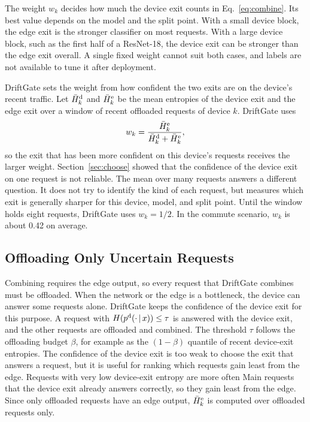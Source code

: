 The weight $w_k$ decides how much the device exit counts in Eq.~\eqref{eq:combine}. Its best value depends on the model and the split point. With a small device block, the edge exit is the stronger classifier on most requests. With a large device block, such as the first half of a ResNet-18, the device exit can be stronger than the edge exit overall. A single fixed weight cannot suit both cases, and labels are not available to tune it after deployment.

DriftGate sets the weight from how confident the two exits are on the device's recent traffic. Let $\bar H^{\mathrm{d}}_k$ and $\bar H^{\mathrm{e}}_k$ be the mean entropies of the device exit and the edge exit over a window of recent offloaded requests of device $k$. DriftGate uses
\begin{equation}
w_k=\frac{\bar H^{\mathrm{e}}_k}{\bar H^{\mathrm{d}}_k+\bar H^{\mathrm{e}}_k},
\label{eq:weight}
\end{equation}
so the exit that has been more confident on this device's requests receives the larger weight. Section~\ref{sec:choose} showed that the confidence of the device exit on one request is not reliable. The mean over many requests answers a different question. It does not try to identify the kind of each request, but measures which exit is generally sharper for this device, model, and split point. Until the window holds eight requests, DriftGate uses $w_k=1/2$. In the commute scenario, $w_k$ is about 0.42 on average.

\subsection{Offloading Only Uncertain Requests}
\label{sec:offload}

Combining requires the edge output, so every request that DriftGate combines must be offloaded. When the network or the edge is a bottleneck, the device can answer some requests alone. DriftGate keeps the confidence of the device exit for this purpose. A request with $H(p^{\mathrm{d}}(\cdot\,|\,x))\le\tau$ is answered with the device exit, and the other requests are offloaded and combined. The threshold $\tau$ follows the offloading budget $\beta$, for example as the $(1-\beta)$ quantile of recent device-exit entropies. The confidence of the device exit is too weak to choose the exit that answers a request, but it is useful for ranking which requests gain least from the edge. Requests with very low device-exit entropy are more often Main requests that the device exit already answers correctly, so they gain least from the edge. Since only offloaded requests have an edge output, $\bar H^{\mathrm{e}}_k$ is computed over offloaded requests only.

